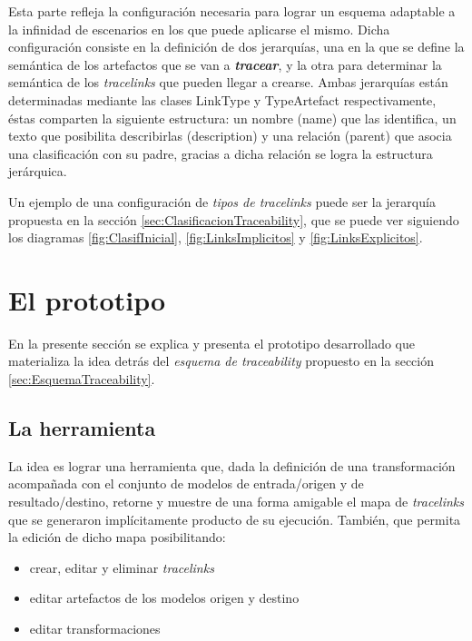\documentclass[a4paper,12pt,oneside,spanish]{book}
\begin{document}
Esta parte refleja la configuración necesaria para lograr un esquema adaptable a la infinidad de escenarios en los que puede aplicarse el mismo. Dicha configuración consiste en la definición de dos jerarquías, una en la que se define la semántica de los artefactos que se van a \textit{\textbf{tracear}}, y la otra para determinar la semántica de los \textit{tracelinks} que pueden llegar a crearse. Ambas jerarquías están determinadas mediante las clases \textsf{LinkType} y \textsf{TypeArtefact} respectivamente, éstas comparten la siguiente estructura: un nombre (\textsf{name}) que las identifica, un texto que posibilita describirlas (\textsf{description}) y una relación (\textsf{parent}) que asocia una clasificación con su padre, gracias a dicha relación se logra la estructura jerárquica.

Un ejemplo de una configuración de \textit{tipos de tracelinks} puede ser la jerarquía propuesta en la sección \ref{sec:ClasificacionTraceability}, que se puede ver siguiendo los diagramas \ref{fig:ClasifInicial}, \ref{fig:LinksImplicitos} y \ref{fig:LinksExplicitos}.




\section{El prototipo}

En la presente sección se explica y presenta el prototipo desarrollado que materializa la idea detrás del \textit{esquema de traceability} propuesto en la sección \ref{sec:EsquemaTraceability}.


\subsection{La herramienta}

La idea es lograr una herramienta que, dada la definición de una transformación acompañada con el conjunto de modelos de entrada/origen y de resultado/destino, retorne y muestre de una forma amigable el mapa de \textit{tracelinks} que se generaron implícitamente producto de su ejecución. También, que permita la edición de dicho mapa posibilitando:
\begin{itemize}
\item crear, editar y eliminar \textit{tracelinks}
\item editar artefactos de los modelos origen y destino
\item editar transformaciones
\end{itemize}
\end{document}
